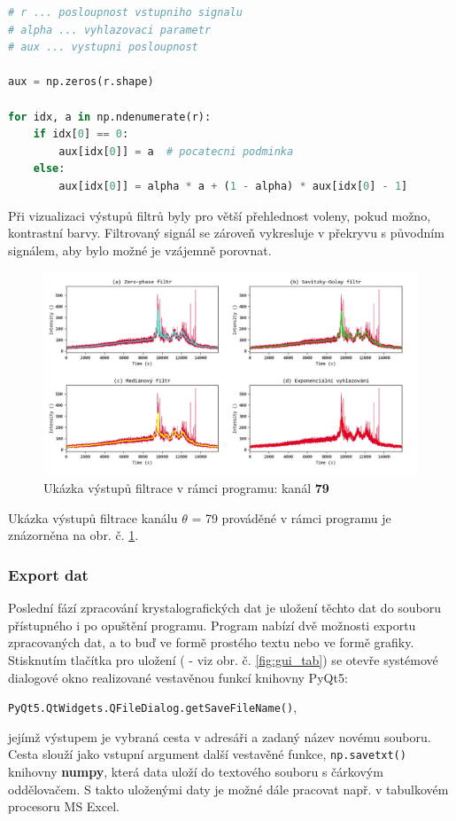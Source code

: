 \documentclass[a4paper, 12pt]{article}
\begin{document}
\vskip 0.2in
\begin{lstlisting}[language=Python,numbers=none,frame=single]
# r ... posloupnost vstupniho signalu
# alpha ... vyhlazovaci parametr
# aux ... vystupni posloupnost

aux = np.zeros(r.shape)

for idx, a in np.ndenumerate(r):
    if idx[0] == 0:
        aux[idx[0]] = a  # pocatecni podminka
    else:
        aux[idx[0]] = alpha * a + (1 - alpha) * aux[idx[0] - 1]
\end{lstlisting}

\vskip 0.1in
Při vizualizaci výstupů filtrů byly pro větší přehlednost voleny, pokud možno, kontrastní barvy. Filtrovaný signál se zároveň vykresluje v překryvu s původním signálem, aby bylo možné je vzájemně porovnat.
\begin{figure}[h!]
 \centering
 \includegraphics[width=\linewidth,height=0.65\linewidth]{exp_figures.png}
 \caption{Ukázka výstupů filtrace v rámci programu: kanál \textbf{79}}
 \label{fig:exp_filtry}
\end{figure}

Ukázka výstupů filtrace kanálu $\theta$ = 79 prováděné v rámci programu je znázorněna na obr. č. \ref{fig:exp_filtry}.

\subsubsection{Export dat} \label{sec:export}
Poslední fází zpracování krystalografických dat je uložení těchto dat do souboru přístupného i po opuštění programu. Program nabízí dvě možnosti exportu zpracovaných dat, a to buď ve formě prostého textu nebo ve formě grafiky.
Stisknutím tlačítka pro uložení ( - viz obr. č. \ref{fig:gui_tab}) se otevře systémové dialogové okno realizované vestavěnou funkcí knihovny PyQt5:
\begin{center}
 \texttt{PyQt5.QtWidgets.QFileDialog.getSaveFileName()},   
\end{center}
jejímž výstupem je vybraná cesta v adresáři a zadaný název novému souboru. Cesta slouží jako vstupní argument další vestavěné funkce, \texttt{np.savetxt()} knihovny \textbf{numpy}, která data uloží do textového souboru s čárkovým oddělovačem. S takto uloženými daty je možné dále pracovat např. v tabulkovém procesoru MS Excel.
\end{document}
